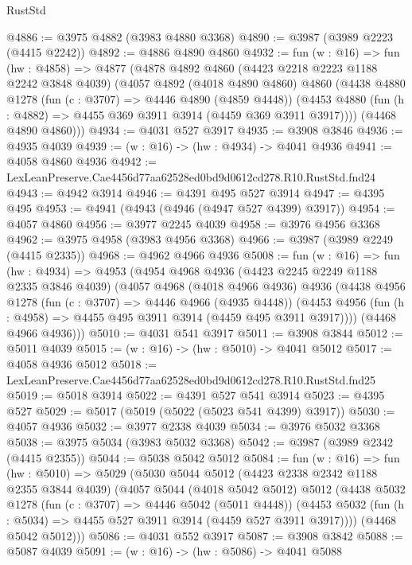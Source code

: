 \begin{lexlean}{RustStd}
\begin{coremodule}
@4886 := @3975 @4882 (@3983 @4880 @3368)
@4890 := @3987 (@3989 @2223 (@4415 @2242))
@4892 := @4886 @4890 @4860
@4932 := fun (w : @16) =>
  fun (hw : @4858) =>
  @4877
    (@4878
      @4892
      @4860
      (@4423 @2218 @2223 @1188 @2242 @3848 @4039)
      (@4057
        @4892
        (@4018 @4890 @4860)
        @4860
        (@4438
          @4880
          @1278
          (fun (c : @3707) => @4446 @4890 (@4859 @4448))
          (@4453 @4880 (fun (h : @4882) => @4455 @369 @3911 @3914 (@4459 @369 @3911 @3917))))
        (@4468 @4890 @4860)))
@4934 := @4031 @527 @3917
@4935 := @3908 @3846
@4936 := @4935 @4039
@4939 := (w : @16) -> (hw : @4934) -> @4041 @4936
@4941 := @4058 @4860 @4936
@4942 := LexLeanPreserve.Cae4456d77aa62528ed0bd9d0612cd278.R10.RustStd.fnd24
@4943 := @4942 @3914
@4946 := @4391 @495 @527 @3914
@4947 := @4395 @495
@4953 := @4941 (@4943 (@4946 (@4947 @527 @4399) @3917))
@4954 := @4057 @4860
@4956 := @3977 @2245 @4039
@4958 := @3976 @4956 @3368
@4962 := @3975 @4958 (@3983 @4956 @3368)
@4966 := @3987 (@3989 @2249 (@4415 @2335))
@4968 := @4962 @4966 @4936
@5008 := fun (w : @16) =>
  fun (hw : @4934) =>
  @4953
    (@4954
      @4968
      @4936
      (@4423 @2245 @2249 @1188 @2335 @3846 @4039)
      (@4057
        @4968
        (@4018 @4966 @4936)
        @4936
        (@4438
          @4956
          @1278
          (fun (c : @3707) => @4446 @4966 (@4935 @4448))
          (@4453 @4956 (fun (h : @4958) => @4455 @495 @3911 @3914 (@4459 @495 @3911 @3917))))
        (@4468 @4966 @4936)))
@5010 := @4031 @541 @3917
@5011 := @3908 @3844
@5012 := @5011 @4039
@5015 := (w : @16) -> (hw : @5010) -> @4041 @5012
@5017 := @4058 @4936 @5012
@5018 := LexLeanPreserve.Cae4456d77aa62528ed0bd9d0612cd278.R10.RustStd.fnd25
@5019 := @5018 @3914
@5022 := @4391 @527 @541 @3914
@5023 := @4395 @527
@5029 := @5017 (@5019 (@5022 (@5023 @541 @4399) @3917))
@5030 := @4057 @4936
@5032 := @3977 @2338 @4039
@5034 := @3976 @5032 @3368
@5038 := @3975 @5034 (@3983 @5032 @3368)
@5042 := @3987 (@3989 @2342 (@4415 @2355))
@5044 := @5038 @5042 @5012
@5084 := fun (w : @16) =>
  fun (hw : @5010) =>
  @5029
    (@5030
      @5044
      @5012
      (@4423 @2338 @2342 @1188 @2355 @3844 @4039)
      (@4057
        @5044
        (@4018 @5042 @5012)
        @5012
        (@4438
          @5032
          @1278
          (fun (c : @3707) => @4446 @5042 (@5011 @4448))
          (@4453 @5032 (fun (h : @5034) => @4455 @527 @3911 @3914 (@4459 @527 @3911 @3917))))
        (@4468 @5042 @5012)))
@5086 := @4031 @552 @3917
@5087 := @3908 @3842
@5088 := @5087 @4039
@5091 := (w : @16) -> (hw : @5086) -> @4041 @5088

\end{coremodule}
\end{lexlean}
